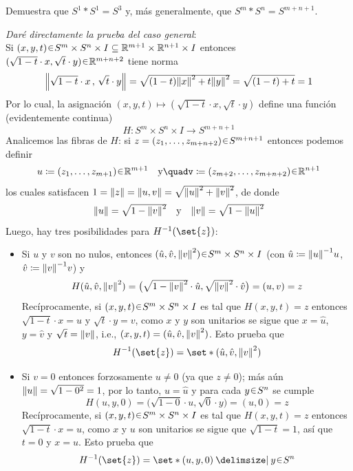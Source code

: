 \setcounter{eje}{17}
\begin{ejer}
Demuestra que $S^1 * S^1 = S^3$ y, más generalmente, que $S^m * S^n = S^{m+n+1}$.
\end{ejer}
\begin{sol}[Demostración]
\emph{Daré directamente la prueba del caso general}:\\
Si $(x,y,t) \en S^m \times S^n \times I \subseteq \mathbb{R}^{m+1} \times \mathbb{R}^{n+1} \times I$ entonces $(\sqrt{1-t} \cdot x,\sqrt{t} \cdot y) \en \mathbb{R}^{m+n+2}$ tiene norma
\[
\norm\Big{\sqrt{1-t} \cdot x\,,\,\sqrt{t} \cdot y} = \sqrt{\vphantom{T^p}(1-t)\norm{x}^{\smash2} + t\norm{y}^{\smash2}} = \sqrt{(1-t)+t} = 1
\]
Por lo cual, la asignación $(x,y,t) \mapsto (\sqrt{1-t} \cdot x,\sqrt{t} \cdot y)$ define una función (evidentemente continua)
\[
H \colon S^m \times S^n \times I \to S^{m+n+1}
\]
Analicemos las fibras de $H$: si $z = (z_1,\dots,z_{m+n+2}) \en S^{m+n+1}$ entonces podemos definir
\[
u \coloneq (z_1,\dots,z_{m+1}) \en \mathbb{R}^{m+1}%
\quad\text{y}\quad%
v \coloneq (z_{m+2},\dots,z_{m+n+2}) \en \mathbb{R}^{n+1}
\]
los cuales satisfacen $1 = \norm{z} = \norm{u,v} = \sqrt{\vphantom{T^T}\norm{u}^{\smash2} + \norm{v}^{\smash2}}$, de donde 
\[
\norm{u} = \sqrt{\vphantom{T^p}1-\norm{v}^{\smash2}}%
\quad\text{y}\quad%
\norm{v} = \sqrt{\vphantom{T^p}1-\norm{u}^{\smash2}}%
\] 
Luego, hay tres posibilidades para $H^{-1}(\set{z})$: 
\begin{itemize}
    \item Si $u$ y $v$ son no nulos, entonces $(\hat{u},\hat{v},\norm{v}^2) \en S^m \times S^n \times I$ (con $\hat{u} \coloneq \norm{u}^{-1}u$, $\hat{v} \coloneq \norm{v}^{-1}v$) y 
    \[
    H(\hat{u},\hat{v},\norm{v}^2)%
    = \big(%
        \sqrt{\vphantom{T^p} 1-\norm{v}^{\smash2}}\cdot\hat{u}, \sqrt{\vphantom{T^p} \norm{v}^{\smash2}}\cdot\hat{v}%
    \big)%
    = (u,v) = z
    \]
    Recíprocamente, si $(x,y,t) \en S^m \times S^n \times I$ es tal que $H(x,y,t) = z$ entonces $\sqrt{1-t} \cdot x = u$ y $\sqrt{t} \cdot y = v$, como $x$ y $y$ son unitarios se sigue que $x = \hat{u}$, $y = \hat{v}$ y $\sqrt{t} = \norm{v}$, i.e., $(x,y,t) = (\hat{u},\hat{v},\norm{v}^2)$. Esto prueba que
    \[
    H^{-1}(\set{z}) = \set*{(\hat{u},\hat{v},\norm{v}^2)}
    \]

    \item Si $v = 0$ entonces forzosamente $u \neq 0$ (ya que $z \neq 0$); más aún $\norm{u} = \sqrt{1-0^2} = 1$, por lo tanto, $u = \hat{u}$ y para cada $y \en S^n$ se cumple
    \[
    H(u, y, 0)%
    = \big(\sqrt{1-0} \cdot u,\sqrt{0} \cdot y\big)%
    = (u,0) = z
    \]
    Recíprocamente, si $(x,y,t) \en S^m \times S^n \times I$ es tal que $H(x,y,t) = z$ entonces $\sqrt{1-t} \cdot x = u$, como $x$ y $u$ son unitarios se sigue que $\sqrt{1-t} = 1$, así que $t=0$ y $x = u$. Esto prueba que
    \[
    H^{-1}(\set{z}) = \set*{(u,y,0) \given y \en S^n}
    \]


\end{itemize}
\end{sol}
